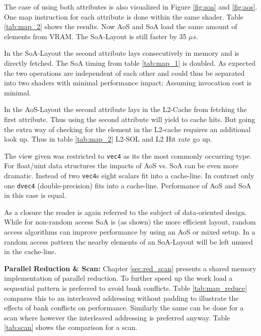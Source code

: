 \documentclass[m,times]{cgMA}
\begin{document}
The case of using both attributes is also visualized in Figure \ref{fig:soa} and \ref{fig:aos}. One map instruction for each attribute is done within the same shader. Table \ref{tab:map_2} shows the results. Now AoS and SoA load the same amount of elements from VRAM. The SoA-Layout is still faster by 35 $\mu s$.

In the SoA-Layout the second attribute lays consecutively in memory and is directly fetched. The SoA timing from table \ref{tab:map_1} is doubled. As expected the two operations are independent of each other and could thus be separated into two shaders with minimal performance impact; Assuming invocation cost is minimal.

In the AoS-Layout the second attribute lays in the L2-Cache from fetching the first attribute. Thus using the second attribute will yield to cache hits. But going the extra way of checking for the element in the L2-cache requires an additional look up. Thus in table \ref{tab:map_2} L2-SOL and L2 Hit rate go up.

The view given was restricted to \texttt{vec4} as its the most commonly occurring type. For float/uint data structures the impacts of AoS vs. SoA can be even more dramatic. Instead of two \texttt{vec4}s eight scalars fit into a cache-line. In contrast only one \texttt{dvec4} (double-precision) fits into a cache-line. Performance of AoS and SoA in this case is equal.

As a closure the reader is again referred to the subject of data-oriented design. While for non-random access SoA is (as shown) the more efficient layout, random access algorithms can improve performance by using an AoS or mixed setup. In a random access pattern the nearby elements of an SoA-Layout will be left unused in the cache-line.

\textbf{Parallel Reduction \& Scan:} Chapter \ref{sec:red_scan} presents a shared memory implementation of parallel reduction. To further speed up the work load a sequential pattern is preferred to avoid bank conflicts. Table \ref{tab:map_reduce} compares this to an interleaved addressing without padding to illustrate the effects of bank conflicts on performance. Similarly the same can be done for a scan where however the interleaved addressing is preferred anyway. Table \ref{tab:scan} shows the comparison for a scan.
\end{document}
